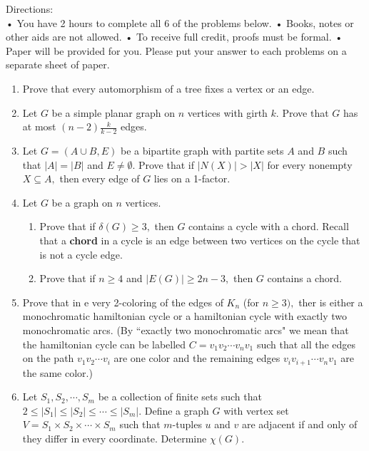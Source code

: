 \documentclass[12pt]{article}
\begin{document}
Directions:\\

• You have 2 hours to complete all 6 of the problems below.
• Books, notes or other aids are not allowed.
• To receive full credit, proofs must be formal.
• Paper will be provided for you. Please put your answer to each problems on a separate sheet of
paper.

\begin{enumerate}

\item Prove that every automorphism of a tree fixes a vertex or an edge.

\item Let $G$ be a simple planar graph on $n$ vertices with girth $k.$ Prove that $G$ has at most $(n-2)\frac{k}{k-2}$ edges.

\item Let $G=(A \cup B, E)$ be a bipartite graph with partite sets $A$ and $B$ such that $|A|=|B|$ and $E\not= \emptyset.$ Prove that if $|N(X)| > |X|$ for every nonempty $X \subseteq A,$ then every edge of $G$ lies on a 1-factor.\\


\item Let $G$ be a graph on $n$ vertices.
	\begin{enumerate}
	\item Prove that if $\delta(G) \geq 3,$ then $G$ contains a cycle with a chord. Recall that a \textbf{chord} in a cycle is an edge between two vertices on the cycle that is not a cycle edge.\\
		
	\item Prove that if $n\geq 4$ and $|E(G)| \geq 2n-3,$ then $G$ contains a chord.\\
	
	\end{enumerate} 
	
	\item Prove that in e very 2-coloring of the edges of $K_n$ (for $n\geq 3),$ ther is either a monochromatic hamiltonian cycle or a hamiltonian cycle with exactly two monochromatic arcs. (By ``exactly two monochromatic arcs" we mean that the hamiltonian cycle can be labelled $C=v_1v_2 \cdots v_nv_1$ such that all the edges on the path $v_1v_2\cdots v_i$ are one color and the remaining edges $v_iv_{i+1} \cdots v_nv_1$ are the same color.)\\
	
	
	
\item Let $S_1,S_2, \cdots,S_m$ be a collection of finite sets such that $2 \leq |S_1| \leq |S_2| \leq \cdots \leq |S_m|.$ Define a graph $G$ with vertex set $V= S_1 \times S_2 \times \cdots \times S_m$ such that $m$-tuples $u$ and $v$ are adjacent if and only of they differ in every coordinate. Determine $\chi(G).$\\



\end{enumerate}
\end{document}
